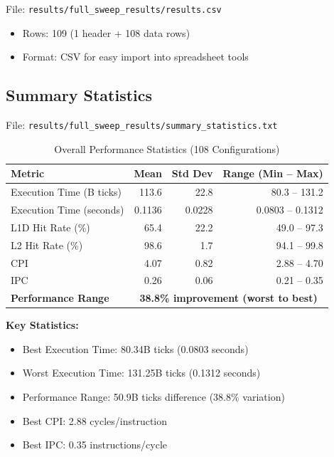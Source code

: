 \documentclass[11pt,a4paper]{article}
\begin{document}
File: \texttt{results/full\_sweep\_results/results.csv}

\begin{itemize}[noitemsep]
    \item Rows: 109 (1 header + 108 data rows)
    \item Format: CSV for easy import into spreadsheet tools
\end{itemize}

\subsection{Summary Statistics}

File: \texttt{results/full\_sweep\_results/summary\_statistics.txt}

\begin{table}[H]
\centering
\caption{Overall Performance Statistics (108 Configurations)}
\begin{tabular}{lrrr}
\toprule
\textbf{Metric} & \textbf{Mean} & \textbf{Std Dev} & \textbf{Range (Min -- Max)} \\
\midrule
Execution Time (B ticks) & 113.6 & 22.8 & 80.3 -- 131.2 \\
Execution Time (seconds) & 0.1136 & 0.0228 & 0.0803 -- 0.1312 \\
L1D Hit Rate (\%) & 65.4 & 22.2 & 49.0 -- 97.3 \\
L2 Hit Rate (\%) & 98.6 & 1.7 & 94.1 -- 99.8 \\
CPI & 4.07 & 0.82 & 2.88 -- 4.70 \\
IPC & 0.26 & 0.06 & 0.21 -- 0.35 \\
\midrule
\textbf{Performance Range} & \multicolumn{3}{c}{\textbf{38.8\% improvement (worst to best)}} \\
\bottomrule
\end{tabular}
\end{table}

\textbf{Key Statistics:}
\begin{itemize}[noitemsep]
    \item Best Execution Time: 80.34B ticks (0.0803 seconds)
    \item Worst Execution Time: 131.25B ticks (0.1312 seconds)
    \item Performance Range: 50.9B ticks difference (38.8\% variation)
    \item Best CPI: 2.88 cycles/instruction
    \item Best IPC: 0.35 instructions/cycle
\end{itemize}
\end{document}
